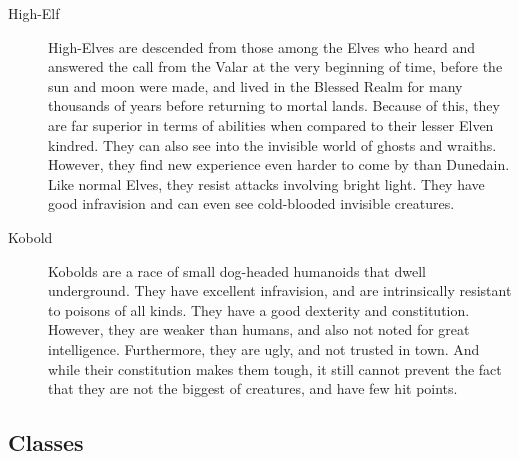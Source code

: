 \begin{description}
\item[High-Elf] High-Elves are descended from those among the Elves who heard
     and answered the call from the Valar at the very beginning of
     time, before the sun and moon were made, and lived in the
     Blessed Realm for many thousands of years before returning to
     mortal lands. Because of this, they are far superior in terms
     of abilities when compared to their lesser Elven kindred. They
     can also see into the invisible world of ghosts and wraiths.
     However, they find new experience even harder to come by than
     Dunedain. Like normal Elves, they resist attacks involving
     bright light. They have good infravision and can even see
     cold-blooded invisible creatures.

\item[Kobold] Kobolds are a race of small dog-headed humanoids that dwell
     underground. They have excellent infravision, and are
     intrinsically resistant to poisons of all kinds. They have
     a good dexterity and constitution. However, they are
     weaker than humans, and also not noted for great
     intelligence. Furthermore, they are ugly, and not
     trusted in town. And while their constitution makes them
     tough, it still cannot prevent the fact that they are not the
     biggest of creatures, and have few hit points.
\end{description}

\subsection{Classes}
